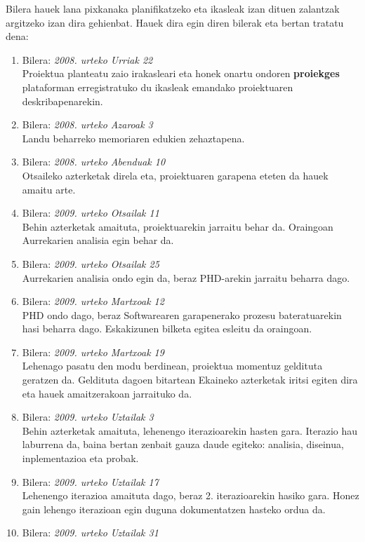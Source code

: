 Bilera hauek lana pixkanaka planifikatzeko eta ikasleak izan dituen zalantzak argitzeko izan dira gehienbat. Hauek dira egin diren bilerak eta bertan tratatu dena:

\begin{enumerate}
	\item Bilera: \textit{2008. urteko Urriak 22}\\
		Proiektua planteatu zaio irakasleari eta honek onartu ondoren \textbf{proiekges} plataforman erregistratuko du ikasleak emandako proiektuaren deskribapenarekin.
	\item Bilera: \textit{2008. urteko Azaroak 3}\\
		Landu beharreko memoriaren edukien zehaztapena.
	\item Bilera: \textit{2008. urteko Abenduak 10}\\
		Otsaileko azterketak direla eta, proiektuaren garapena eteten da hauek amaitu arte.
	\item Bilera: \textit{2009. urteko Otsailak 11}\\
		Behin azterketak amaituta, proiektuarekin jarraitu behar da. Oraingoan Aurrekarien analisia egin behar da.
	\item Bilera: \textit{2009. urteko Otsailak 25}\\
		Aurrekarien analisia ondo egin da, beraz PHD-arekin jarraitu beharra dago.
	\item Bilera: \textit{2009. urteko Martxoak 12}\\
		PHD ondo dago, beraz Softwarearen garapenerako prozesu bateratuarekin hasi beharra dago. Eskakizunen bilketa egitea esleitu da oraingoan.
	\item Bilera: \textit{2009. urteko Martxoak 19}\\
		Lehenago pasatu den modu berdinean, proiektua momentuz geldituta geratzen da. Geldituta dagoen bitartean Ekaineko azterketak iritsi egiten dira eta hauek amaitzerakoan jarraituko da.	
	\item Bilera: \textit{2009. urteko Uztailak 3}\\
		Behin azterketak amaituta, lehenengo iterazioarekin hasten gara. Iterazio hau laburrena da, baina bertan zenbait gauza daude egiteko: analisia, diseinua, inplementazioa eta probak.
	\item Bilera: \textit{2009. urteko Uztailak 17}\\
		Lehenengo iterazioa amaituta dago, beraz 2. iterazioarekin hasiko gara. Honez gain lehengo iterazioan egin duguna dokumentatzen hasteko ordua da.
	\item Bilera: \textit{2009. urteko Uztailak 31}\\

\end{enumerate}
